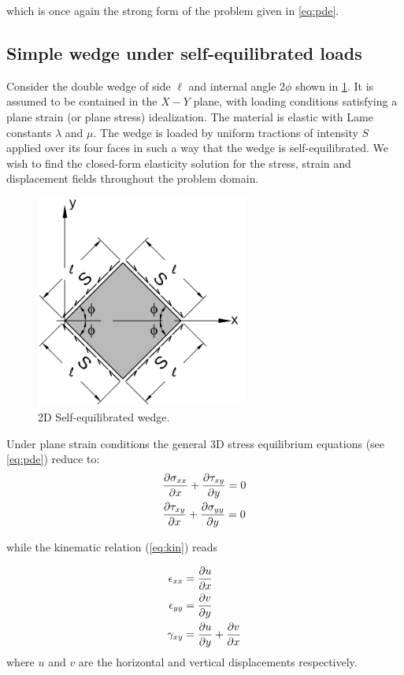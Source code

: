 which is once again the strong form of the problem given in \cref{eq:pde}.

\subsection*{Simple wedge under self-equilibrated loads}
Consider the double wedge of side $\ell$ and internal angle $2 \phi$ shown in \cref{fig:WEDGE}. It is assumed to be contained in the $X-Y$ plane, with loading conditions satisfying a plane strain (or plane stress) idealization. The material is elastic with Lame constants $\lambda$ and $\mu$. The wedge is loaded by uniform tractions of intensity $S$ applied over its four faces in such a way that the wedge is self-equilibrated. We wish to find the closed-form elasticity solution for the stress, strain and displacement fields throughout the problem domain.
%
\begin{figure}[H]
\centering
\includegraphics[width=7cm]{wedge.pdf}
\caption{2D Self-equilibrated wedge.}
\label{fig:WEDGE}
\end{figure}

Under plane strain conditions the general 3D stress equilibrium equations (see \cref{eq:pde}) reduce to:
\begin{equation}
\begin{aligned}
&\pdv{\sigma_{xx}}{x}+\pdv{\tau_{xy}}{y}=0\\
&\pdv{\tau_{xy}}{x}+\pdv{\sigma_{yy}}{y}=0
\end{aligned}
\label{eq:equilibrium}
\end{equation}

while the kinematic relation (\cref{eq:kin}) reads

\begin{equation}
\begin{aligned}
\epsilon_{xx}&=\pdv{u}{x}\\
\epsilon_{yy}&=\pdv{v}{y}\\
\gamma_{xy}&=\pdv{u}{y} + \pdv{v}{x}
\end{aligned}
\label{eq:strain}
\end{equation}
where $u$ and $v$ are the horizontal and vertical displacements respectively.

